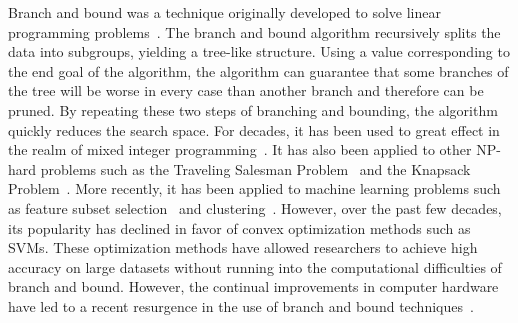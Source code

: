 Branch and bound was a technique originally developed to solve linear programming problems~\cite{LandDo60}.
The branch and bound algorithm recursively splits the data into subgroups, yielding a tree-like structure.
Using a value corresponding to the end goal of the algorithm, the algorithm can guarantee that some branches of the tree will be worse in every case than another branch and therefore can be pruned.
By repeating these two steps of branching and bounding, the algorithm quickly reduces the search space.
For decades, it has been used to great effect in the realm of mixed integer programming~\cite{LinderothSa99}.
It has also been applied to other NP-hard problems such as the Traveling Salesman Problem~\cite{LittleMuSwKa63} and the Knapsack Problem~\cite{Kolesar67}.
More recently, it has been applied to machine learning problems such as feature subset selection~\cite{NarendraFu77} and clustering~\cite{NarendraFu75}.
However, over the past few decades, its popularity has declined in favor of convex optimization methods such as SVMs.
These optimization methods have allowed researchers to achieve high accuracy on large datasets without running into the computational difficulties of branch and bound.
However, the continual improvements in computer hardware have led to a recent resurgence in the use of branch and bound techniques~\cite{BertsimasKiMa16}.
